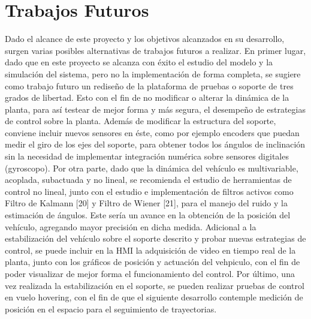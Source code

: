 \documentclass[../main.tex]{subfiles}
\begin{document}
\section{Trabajos Futuros}
Dado el alcance de este proyecto y los objetivos alcanzados en su desarrollo, surgen varias posibles alternativas de trabajos futuros a realizar.
\hfill \break
En primer lugar, dado que en este proyecto se alcanza con éxito el estudio del modelo y la simulación del sistema, pero no la implementación de forma completa, se sugiere como trabajo futuro un rediseño de la plataforma de pruebas o soporte de tres grados de libertad. Esto con el fin de no modificar o alterar la dinámica de la planta, para así testear de mejor forma y más segura, el desempeño de estrategias de control sobre la planta.
\hfill \break
Además de modificar la estructura del soporte, conviene incluir nuevos sensores en éste, como por ejemplo encoders que puedan medir el giro de los ejes del soporte, para obtener todos los ángulos de inclinación sin la necesidad de implementar integración numérica sobre sensores digitales (gyroscopo).
\hfill \break
Por otra parte, dado que la dinámica del vehículo es multivariable, acoplada, subactuada y no lineal, se recomienda el estudio de herramientas de control no lineal, junto con el estudio e implementación de filtros activos como Filtro de Kalmann [20] y Filtro de Wiener [21], para el manejo del ruido y la estimación de ángulos. Este sería un avance en la obtención de la posición del vehículo, agregando mayor precisión en dicha medida.
\hfill \break
Adicional a la estabilización del vehículo sobre el soporte descrito y probar nuevas estrategias de control, se puede incluir en la HMI la adquisición de video en tiempo real de la planta, junto con los gráficos de posición y actuación del vehpiculo, con el fin de poder visualizar de mejor forma el funcionamiento del control. 
\hfill \break
Por último, una vez realizada la estabilización en el soporte, se pueden realizar pruebas de control en vuelo hovering, con el fin de que el siguiente desarrollo contemple medición de posición en el espacio para el seguimiento de trayectorias.
\end{document}
